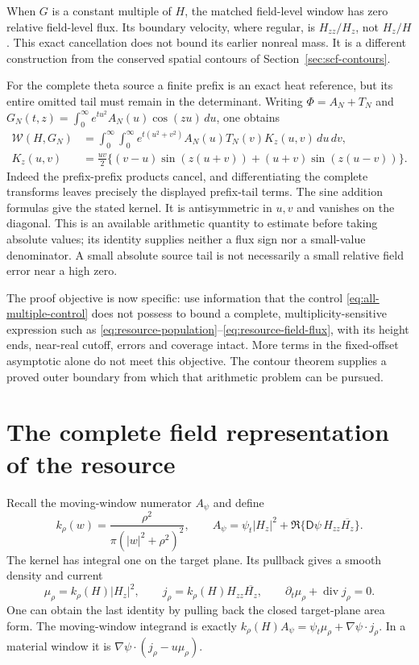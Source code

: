 \documentclass[11pt]{article}
\newcommand{\dd}{\,d}
\newcommand{\D}{\mathsf D}
\newcommand{\WW}{\mathcal W}
\theoremstyle{remark}
\begin{document}
When $G$ is a constant multiple of $H$, the matched field-level window
has zero relative field-level flux. Its boundary velocity, where
regular, is $H_{zz}/H_z$, not $H_z/H$. This exact cancellation does not
bound its earlier nonreal mass. It is a different construction from
the conserved spatial contours of Section~\ref{sec:scf-contours}.

For the complete theta source a finite prefix is an exact heat
reference, but its entire omitted tail must remain in the determinant.
Writing $\Phi=A_N+T_N$ and
$G_N(t,z)=\int_0^\infty e^{tu^2}A_N(u)\cos(zu)\dd u$, one obtains
\begin{align}
 \WW(H,G_N)&=\int_0^\infty\!\int_0^\infty
 e^{t(u^2+v^2)}A_N(u)T_N(v)K_z(u,v)\dd u\dd v,
 \label{eq:complete-residual}\\
 K_z(u,v)&=\frac{uv}{2}\bigl\{(v-u)\sin(z(u+v))
                    +(u+v)\sin(z(u-v))\bigr\}.
 \label{eq:antisymmetric-kernel}
\end{align}
Indeed the prefix-prefix products cancel, and differentiating the
complete transforms leaves precisely the displayed prefix-tail terms.
The sine addition formulas give the stated kernel. It is
antisymmetric in $u,v$ and vanishes on the diagonal. This is an
available arithmetic quantity to estimate before taking absolute values;
its identity supplies neither a flux sign nor a small-value denominator.
A small absolute source tail is not necessarily a small relative field
error near a high zero.

The proof objective is now specific: use information that the control
\eqref{eq:all-multiple-control} does not possess to bound a complete,
multiplicity-sensitive expression such as
\eqref{eq:resource-population}--\eqref{eq:resource-field-flux}, with its
height ends, near-real cutoff, errors and coverage intact. More terms in
the fixed-offset asymptotic alone do not meet this objective. The
contour theorem supplies a proved outer boundary from which that
arithmetic problem can be pursued.

\appendix
\section{The complete field representation of the resource}
\label{sec:field}

Recall the moving-window numerator $A_\psi$ and define
\begin{equation}
 k_\rho(w)=\frac{\rho^2}{\pi(|w|^2+\rho^2)^2},\qquad
 A_\psi=\psi_t|H_z|^2+\Re\{\D\psi\,H_{zz}\overline{H_z}\}.
 \label{eq:kernel}
\end{equation}
The kernel has integral one on the target plane. Its pullback gives a
smooth density and current
\[
 \mu_\rho=k_\rho(H)|H_z|^2,\qquad
 j_\rho=k_\rho(H)H_{zz}\overline{H_z},\qquad
 \partial_t\mu_\rho+\operatorname{div}j_\rho=0.
\]
One can obtain the last identity by pulling back the closed target-plane
area form. The moving-window integrand is exactly
$k_\rho(H)A_\psi=\psi_t\mu_\rho+\nabla\psi\cdot j_\rho$. In a material window it is
$\nabla\psi\cdot(j_\rho-u\mu_\rho)$.
\end{document}
